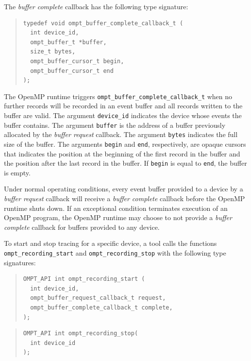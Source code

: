 \documentclass{article}
\begin{document}
The \emph{buffer complete} callback has the following type signature: 
\begin{quote}
\begin{verbatim}
typedef void ompt_buffer_complete_callback_t (
  int device_id, 
  ompt_buffer_t *buffer,
  size_t bytes,
  ompt_buffer_cursor_t begin,
  ompt_buffer_cursor_t end
);
\end{verbatim}
\end{quote}
The OpenMP runtime triggers \verb|ompt_buffer_complete_callback_t| when no further records will be recorded in an event buffer and all records written to the buffer are valid. 
The argument \verb|device_id| indicates the device whose events the buffer contains. The argument \verb|buffer| is the address of a buffer previously allocated by the \emph{buffer request} callback. The argument \verb|bytes| indicates the full size of the buffer. The arguments \verb|begin| and \verb|end|, respectively, are opaque cursors that indicates the position at the beginning of the first record in the buffer and the position after the last record in the buffer. If \verb|begin| is equal to \verb|end|, the buffer is empty. 

Under normal operating conditions, every event buffer provided to a device by a \emph{buffer request} callback will receive a \emph{buffer complete} callback before the OpenMP runtime shuts down. If an exceptional condition terminates  execution of an OpenMP program, the OpenMP runtime may choose to not provide a \emph{buffer complete} callback for buffers provided to any device.

To start and stop tracing for a specific device, a tool calls the functions \verb|ompt_recording_start| and \verb|ompt_recording_stop| with the following type signatures:
\begin{quote}
\begin{verbatim}
OMPT_API int ompt_recording_start (
  int device_id, 
  ompt_buffer_request_callback_t request,
  ompt_buffer_complete_callback_t complete,
);
\end{verbatim}
\end{quote}
\begin{quote}
\begin{verbatim}
OMPT_API int ompt_recording_stop(
  int device_id 
);
\end{verbatim}
\end{quote}
\end{document}
